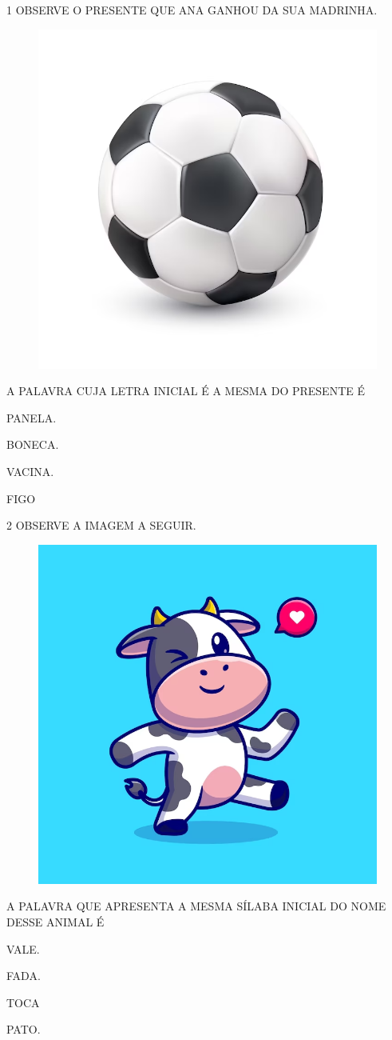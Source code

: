 \num{1} OBSERVE O PRESENTE QUE ANA GANHOU DA SUA MADRINHA.

\begin{figure}[H]
\centering
\includegraphics[width=.35\textwidth]{./media/image221.png}
\end{figure}

A PALAVRA CUJA LETRA INICIAL É A MESMA DO PRESENTE É

\begin{escolha}
\item PANELA.

\item BONECA.

\item VACINA.

\item FIGO

\end{escolha}

\num{2} OBSERVE A IMAGEM A SEGUIR.

\begin{figure}[H]
\centering
\includegraphics[width=.4\textwidth]{./media/image222.png}
\end{figure}

A PALAVRA QUE APRESENTA A MESMA SÍLABA INICIAL DO NOME DESSE ANIMAL É

\begin{escolha}
\item VALE.

\item FADA.

\item TOCA

\item PATO.

\end{escolha}

